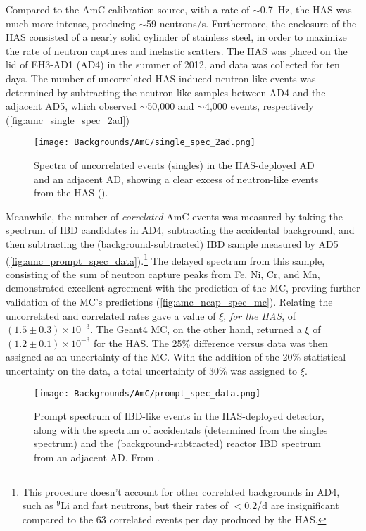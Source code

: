\documentclass[../thesis.tex]{subfiles}
\begin{document}
Compared to the AmC calibration source, with a rate of $\sim$0.7~Hz, the HAS was much more intense, producing $\sim$59 neutrons/s. Furthermore, the enclosure of the HAS consisted of a nearly solid cylinder of stainless steel, in order to maximize the rate of neutron captures and inelastic scatters. The HAS was placed on the lid of EH3-AD1 (AD4) in the summer of 2012, and data was collected for ten days. The number of uncorrelated HAS-induced neutron-like events was determined by subtracting the neutron-like samples between AD4 and the adjacent AD5, which observed $\sim$50,000 and $\sim$4,000 events, respectively (\autoref{fig:amc_single_spec_2ad})

\begin{figure}[ht]
  \texttt{[image: Backgrounds/AmC/single\_spec\_2ad.png]}
  \caption{Spectra of uncorrelated events (singles) in the HAS-deployed AD and an adjacent AD, showing a clear excess of neutron-like events from the HAS (\cite{Gu_2016}).}
  \label{fig:amc_single_spec_2ad}
\end{figure}

Meanwhile, the number of \emph{correlated} AmC events was measured by taking the spectrum of IBD candidates in AD4, subtracting the accidental background, and then subtracting the (background-subtracted) IBD sample measured by AD5 (\autoref{fig:amc_prompt_spec_data}).\footnote{This procedure doesn't account for other correlated backgrounds in AD4, such as $^9$Li and fast neutrons, but their rates of $< 0.2$/d are insignificant compared to the 63 correlated events per day produced by the HAS.} The delayed spectrum from this sample, consisting of the sum of neutron capture peaks from Fe, Ni, Cr, and Mn, demonstrated excellent agreement with the prediction of the MC, proviing further validation of the MC's predictions (\autoref{fig:amc_ncap_spec_mc}). Relating the uncorrelated and correlated rates gave a value of $\xi$, \emph{for the HAS}, of $(1.5\pm0.3)\times10^{-3}$. The Geant4 MC, on the other hand, returned a $\xi$ of $(1.2\pm0.1)\times10^{-3}$ for the HAS. The 25\% difference versus data was then assigned as an uncertainty of the MC. With the addition of the 20\% statistical uncertainty on the data, a total uncertainty of 30\% was assigned to $\xi$.

\begin{figure}[ht]
  \texttt{[image: Backgrounds/AmC/prompt\_spec\_data.png]}
  \caption{Prompt spectrum of IBD-like events in the HAS-deployed detector, along with the spectrum of accidentals (determined from the singles spectrum) and the (background-subtracted) reactor IBD spectrum from an adjacent AD. From \cite{Gu_2016}.}
  \label{fig:amc_prompt_spec_data}
\end{figure}
\end{document}
